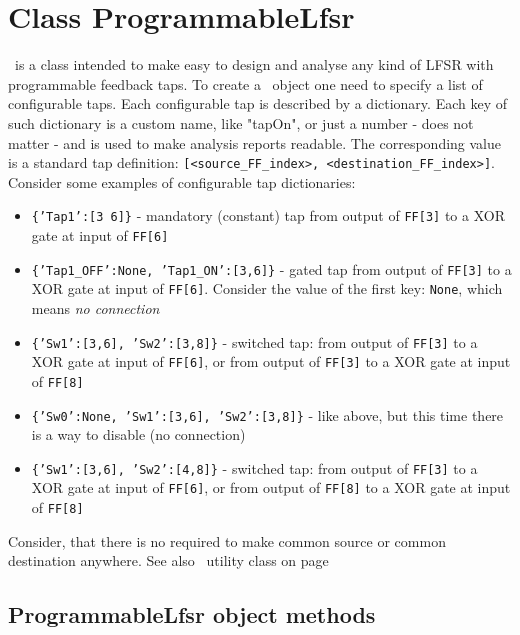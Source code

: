 \chapter{Class ProgrammableLfsr}

\ProgrammableLfsr\ is a class intended to make easy to design and analyse any kind of LFSR with programmable feedback taps.  To create a \ProgrammableLfsr\ object one need to specify a list of configurable taps. Each configurable tap is described by a dictionary. Each key of such dictionary is a custom name, like "tapOn", or just a number - does not matter - and is used to make analysis reports readable. The corresponding value is a standard tap definition: \texttt{[<source\_FF\_index>, <destination\_FF\_index>]}. Consider some examples of configurable tap dictionaries:
\label{configurabletapsdictionary}
\begin{itemize}
	\item \texttt{\{'Tap1':[3 6]\}} - mandatory (constant) tap from output of \texttt{FF[3]} to a XOR gate at input of \texttt{FF[6]}
	\item \texttt{\{'Tap1\_OFF':None, 'Tap1\_ON':[3,6]\}} - gated tap from output of \texttt{FF[3]} to a XOR gate at input of \texttt{FF[6]}. Consider the value of the first key: \texttt{None}, which means \textit{no connection}
	\item \texttt{\{'Sw1':[3,6], 'Sw2':[3,8]\}} - switched tap: from output of \texttt{FF[3]} to a XOR gate at input of \texttt{FF[6]}, or from output of \texttt{FF[3]} to a XOR gate at input of \texttt{FF[8]}
	\item \texttt{\{'Sw0':None, 'Sw1':[3,6], 'Sw2':[3,8]\}} - like above, but this time there is a way to disable (no connection)
	\item \texttt{\{'Sw1':[3,6], 'Sw2':[4,8]\}} - switched tap: from output of \texttt{FF[3]} to a XOR gate at input of \texttt{FF[6]}, or from output of \texttt{FF[8]} to a XOR gate at input of \texttt{FF[8]}
\end{itemize}
Consider, that there is no required to make common source or common destination anywhere. See also \ProgrammableLfsrConfig\ utility class on page \pageref{programmablelefsrconfig}

\section{ProgrammableLfsr object methods}

